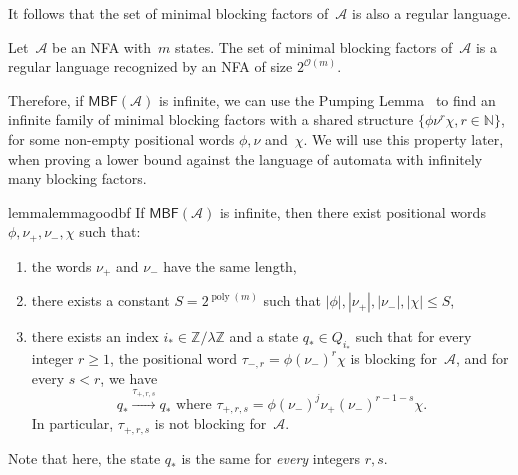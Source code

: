 \documentclass[letterpaper, USenglish, cleveref, autoref, thm-restate, numberwithinsect]{lipics-v2021}
\theoremstyle{theorem}
\theoremstyle{definition}
\DeclareMathOperator{\poly}{poly}
\newcommand{\Aa}{\mathcal{A}}
\newcommand{\cO}{\mathcal{O}}
\newcommand{\MBF}{\textsf{MBF}\xspace}
\newcommand{\NN}{\mathbb{N}}
\newcommand{\ZZ}{\mathbb{Z}}
\begin{document}
It follows that the set of minimal blocking factors of~$\Aa$ is also a regular language.
\begin{corollary}
   Let~$\Aa$ be an NFA with~$m$ states.
   The set of minimal blocking factors of~$\Aa$ is a regular language recognized by an NFA of size $2^{\cO(m)}$.
\end{corollary}

Therefore, if $\MBF(\Aa)$ is infinite, we can use the Pumping Lemma~\cite[Chapter 1, Proposition 2.2]{Pin2021} to find an infinite family of minimal blocking factors with a shared structure $\{\phi \nu^r \chi, r\in\NN\}$, for some non-empty positional words $\phi, \nu$ and~$\chi$. We will use this property later, when proving a lower bound against the language of automata with infinitely many blocking factors.
\begin{restatable}{lemma}{lemmagoodbf}\label{lemma:good-bf}
    If $\MBF(\Aa)$ is infinite, then there exist positional words $\phi,\nu_+,\nu_-,\chi$ such that:
    \begin{enumerate}
        \item the words $\nu_+$ and $\nu_-$ have the same length,
        \item there exists a constant $ S = 2^{\poly(m)}$ such that $|\phi|, |\nu_+|, |\nu_-|, |\chi|\le  S$,
        \item there exists an index $i_*\in\ZZ/ \lambda\ZZ$ and a state $q_*\in Q_{i_*}$ such that for every integer $r \ge 1$,
        the positional word $\tau_{-,r} = \phi(\nu_-)^r\chi$ is blocking for~$\Aa$, and for every $s < r$, we have
        \[q_* \xrightarrow{\tau_{+,r,s}} q_* \text{ where } \tau_{+,r,s} = \phi(\nu_-)^j\nu_+(\nu_-)^{r-1-s}\chi.\]
        In particular, $\tau_{+,r,s}$ is not blocking for~$\Aa$.
    \end{enumerate}
\end{restatable}
Note that here, the state $q_*$ is the same for \emph{every} integers $r, s$.
\end{document}
